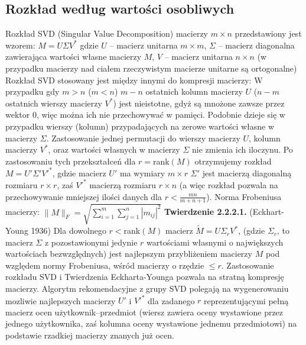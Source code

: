 \documentclass{pracamgr}
\begin{document}
   \subsection{Rozkład według wartości osobliwych}
    Rozkład SVD (Singular Value Decomposition) macierzy $m\times n$ przedstawiony jest wzorem:
    $M=U\Sigma V^*$\newline
    gdzie $U$ -- macierz unitarna $m\times m$, $\Sigma$ -- macierz diagonalna zawierająca wartości własne macierzy $M$,
    $V$ -- macierz unitarna $n\times n$\newline
    (w przypadku macierzy nad ciałem rzeczywistym macierze unitarne są ortogonalne)\newline\newline
    Rozkład SVD stosowany jest między innymi do kompresji macierzy:\newline
    W przypadku gdy $m>n$ ($m<n$) $m-n$ ostatnich kolumn macierzy $U$ ($n-m$ ostatnich wierszy macierzy $V^*$) jest nieistotne,
    gdyż są mnożone zawsze przez wektor $0$, więc można ich nie przechowywać w pamięci.\newline
    Podobnie dzieje się w przypadku wierszy (kolumn) przypadających na zerowe wartości własne w macierzy $\Sigma$.\newline
    Zastosowanie jednej permutacji do wierszy macierzy $U$, kolumn macierzy $V^*$, oraz wartości własnych w macierzy $\Sigma$ nie zmienia ich iloczynu.\newline
    Po zastosowaniu tych przekształceń dla $r=$rank$(M)$ otrzymujemy rozkład $M=U'\Sigma'V'^{*}$, gdzie macierz $U'$ ma wymiary $m\times r$ $\Sigma'$
    jest macierzą diagonalną rozmiaru $r\times r$, zaś $V'^{*}$ macierzą rozmiaru $r\times n$
    (a więc rozkład pozwala na przechowywanie mniejszej ilości danych dla $r<\frac{mn}{m+n+1}$).\newline
    Norma Frobeniusa macierzy: $\lVert M \rVert_F=\sqrt{\sum\limits_{i=1}^{m}\sum\limits_{j=1}^{n}|m_{ij}|^2}$\newline
    \textbf{Twierdzenie 2.2.2.1.} (Eckhart-Young 1936) Dla dowolnego $r<$rank$(M)$
    macierz $\tilde{M}=U\Sigma_r V^*$,
    (gdzie $\Sigma_r$, to macierz $\Sigma$ z pozostawionymi jedynie $r$ wartościami własnymi o największych wartościach bezwzględnych)
    jest najlepszym przybliżeniem macierzy $M$ pod względem normy Frobeniusa, wśród macierzy o rzędzie $\le r$.\newline
    Zastosowanie rozkładu SVD i Twierdzenia Eckharta-Younga pozwala na stratną kompresję macierzy.\newline\newline
    Algorytm rekomendacyjne z grupy SVD polegają na wygenerowaniu mozliwie
    najlepszych macierzy $U'$ i $V'^{*}$ dla zadanego $r$ reprezentującymi pełną macierz ocen użytkownik--przedmiot
    (wiersz zawiera oceny wystawione przez jednego użytkownika, zaś kolumna oceny wystawione jednemu przedmiotowi)
    na podstawie rzadkiej macierzy znanych już ocen.
\end{document}
